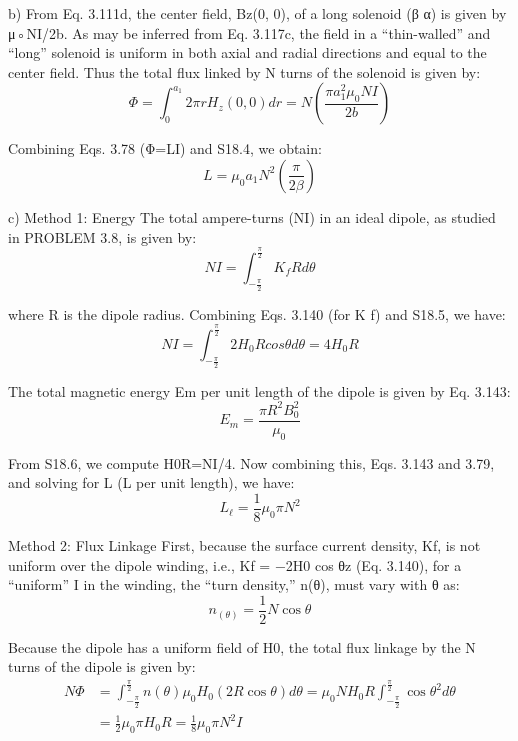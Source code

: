 b) From Eq. 3.111d, the center field, Bz(0, 0), of a long solenoid (β α) is given
by μ◦NI/2b. As may be inferred from Eq. 3.117c, the field in a “thin-walled” and
“long” solenoid is uniform in both axial and radial directions and equal to the
center field. Thus the total flux linked by N turns of the solenoid is given by:
 \begin{equation}%
\Phi=\int_{0}^{a_1}2\pi rH_z(0,0)dr=N(\frac{\pi a_{1}^{2}\mu_0NI}{2b})
\end{equation}

Combining Eqs. 3.78 (Φ=LI) and S18.4, we obtain:
 \begin{equation}%
L=\mu_0a_1N^2(\frac{\pi}{2\beta})
\end{equation}

c) Method 1: Energy The total ampere-turns (NI) in an ideal dipole, as
studied in PROBLEM 3.8, is given by:
 \begin{equation}%
NI=\int_{-\frac{\pi}{2}}^{\frac{\pi}{2}}K_fRd\theta
\end{equation}

where R is the dipole radius. Combining Eqs. 3.140 (for K f) and S18.5, we have:
 \begin{equation}%
NI=\int_{-\frac{\pi}{2}}^{\frac{\pi}{2}}2H_0Rcos\theta d\theta=4H_0R
\end{equation}

The total magnetic energy Em per unit length of the dipole is given by Eq. 3.143:
 \begin{equation}%
E_m=\frac{\pi R^2B_{0}^{2}}{\mu_0}
\end{equation}

From S18.6, we compute H0R=NI/4. Now combining this, Eqs. 3.143 and 3.79,
and solving for L (L per unit length), we have:
 \begin{equation}%
L_\ell=\frac{1}{8}\mu_0\pi N^2
\end{equation}

Method 2: Flux Linkage First, because the surface current density, Kf, is
not uniform over the dipole winding, i.e., Kf = −2H0 cos θz (Eq. 3.140), for a
“uniform” I in the winding, the “turn density,” n(θ), must vary with θ as:
 \begin{equation}%
n_(\theta)=\frac{1}{2}N\cos\theta
\end{equation}

Because the dipole has a uniform field of H0, the total flux linkage by the N turns
of the dipole is given by:
\begin{equation}%
\begin{split}
N\Phi&=\int_{-\frac{\pi}{2}}^{\frac{\pi}{2}}n(\theta)\mu_0H_0(2R\cos\theta)d\theta=
\mu_0NH_0R\int_{-\frac{\pi}{2}}^{\frac{\pi}{2}}\cos\theta^2d\theta \\
&=\frac{1}{2}\mu_0\pi H_0 R=\frac{1}{8}\mu_0\pi N^2I
\end{split}
\end{equation}

